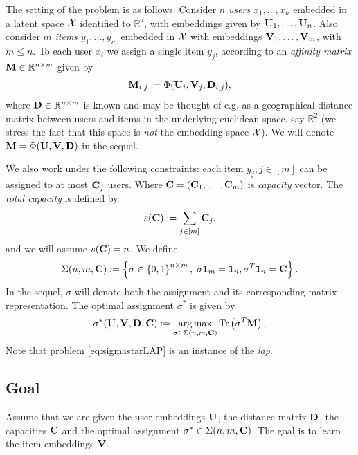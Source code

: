 The setting of the problem is as follows. Consider $n$ \emph{users} $x_1,
    \ldots, x_n$ embedded in a latent space $\mathcal {X}$ identified to $\mathbb{R}^d$, with
embeddings given by $\mathbf{U}_1, \ldots, \mathbf{U}_n$. Also consider $m$ \emph{items}
$y_1,\ldots, y_m$ embedded in $\mathcal {X}$ with embeddings $\mathbf{V}_1, \ldots, \mathbf{V}_m$, with
$m \leq n$. To each user $x_i$ we assign a single item $y_j$, according to an
\emph{affinity matrix} $\mathbf{M} \in \mathbb{R}^{n \times m}$ given by
\begin{equation*}\label{eq:def_M}
    \mathbf{M}_{i,j} := \Phi(\mathbf{U}_i,\mathbf{V}_j,\mathbf{D}_{i,j}),
\end{equation*} where $\mathbf{D} \in \mathbb{R}^{n \times m}$ is known and may be thought of e.g. as a geographical distance matrix between users and items in the underlying euclidean space, say $\mathbb{R}^2$ (we stress the fact that this space is \emph{not} the embedding space $\mathcal {X}$). We will denote $\mathbf{M} = \Phi(\mathbf{U},\mathbf{V},\mathbf{D})$ in the sequel.

We also work under the following constraints: each item $y_j, j \in [m]$ can be
assigned to at most $\mathbf{C}_j$ users. Where $\mathbf{C}=(\mathbf{C}_1,\ldots,\mathbf{C}_m)$ is
\emph{capacity} vector. The \emph{total capacity} is defined by
\begin{equation*}
    s(\mathbf{C}) := \sum_{j \in [m]} \mathbf{C}_j,
\end{equation*} and we will assume $s(\mathbf{C}) = n$.
We define
\begin{equation*}\label{eq:defSigma}
    \Sigma(n,m,\mathbf{C}) := \left\lbrace \sigma \in \left\{ 0,1\right\}^{n \times m}, \; {\sigma \mathbf{1}_m}  = { \mathbf{1}_n}, {\sigma^T \mathbf{1}_n} = \mathbf{C} \right\rbrace.
\end{equation*} In the sequel, $\sigma$ will denote both the assignment and its corresponding matrix representation. The optimal assignment $\sigma^*$ is given by
\begin{equation}\label{eq:sigmastarLAP}
    \sigma^*(\mathbf{U},\mathbf{V},\mathbf{D},\mathbf{C}) := \operatorname*{arg\,max}_{\sigma \in \Sigma(n,m,\mathbf{C})} {\rm Tr}\left( \sigma^T \mathbf{M} \right),
\end{equation}
Note that problem \eqref{eq:sigmastarLAP} is an instance of the \emph{\ac{lap}}.

\subsection*{Goal} Assume that we are given the user embeddings $\mathbf{U}$, the
distance matrix $\mathbf{D}$, the capacities $\mathbf{C}$ and the optimal assignment $\sigma^*
    \in \Sigma(n,m,\mathbf{C})$. The goal is to learn the item embeddings $\mathbf{V}$.

